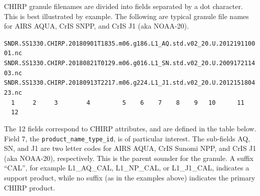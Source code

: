 \documentclass[11pt]{article}
\begin{document}
CHIRP granule filenames are divided into fields separated by a dot
character.  This is best illustrated by example.  The following are
typical granule file names for AIRS AQUA, CrIS SNPP, and CrIS J1
(aka NOAA-20).

\begin{center}
\texttt{SNDR.SS1330.CHIRP.20180901T1835.m06.g186.L1\_AQ.std.v02\_20.U.201219110001.nc} \\
\texttt{SNDR.SS1330.CHIRP.20180821T0129.m06.g016.L1\_SN.std.v02\_20.U.200917211403.nc} \\
\texttt{SNDR.SS1330.CHIRP.20180913T2217.m06.g224.L1\_J1.std.v02\_20.U.201215180423.nc} \\
\texttt{~~1~~~~~2~~~~~3~~~~~~~~4~~~~~~~~~5~~~~6~~~~7~~~~8~~~~9~~~10~~~~~~11~~~~~12} \\
\end{center}

The 12 fields correspond to CHIRP attributes, and are defined in the
table below.  Field 7, the \texttt{product\_name\_type\_id}, is of
particular interest.  The sub-fields AQ, SN, and J1 are two letter
codes for AIRS AQUA, CrIS Sunomi NPP, and CrIS J1 (aka NOAA-20),
respectively.  This is the parent sounder for the granule.  A suffix
``CAL'', for example L1\_AQ\_CAL, L1\_NP\_CAL, or L1\_J1\_CAL,
indicates a support product, while no suffix (as in the examples
above) indicates the primary CHIRP product.
\end{document}
